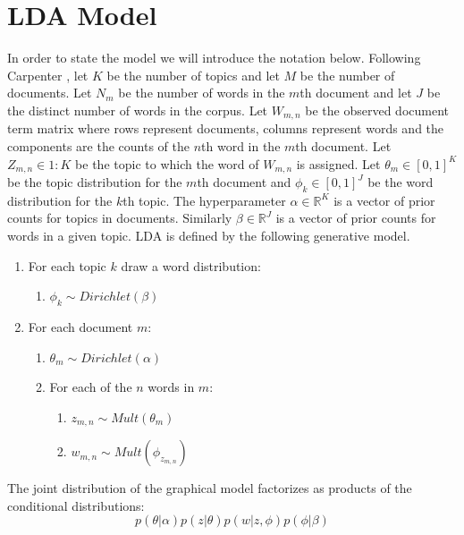 \documentclass{article}%
\theoremstyle{definition}
\begin{document}
\section{LDA Model}
\label{sec:ldamodel}
In order to state the model we will introduce the notation below. Following Carpenter \cite{Carpenter10integrating}, let $K$ be the number of topics and let $M$ be the number of documents. Let $N_m$ be the number of words in the $m$th document and let $J$ be the distinct number of words in the corpus. Let  $W_{m,n}$ be the observed document term matrix where rows represent documents, columns represent words and the components are the counts of the $n$th word in the $m$th document. Let $Z_{m,n} \in 1:K$ be the topic to which the word of $W_{m,n}$ is assigned. Let $\theta_m \in [0, 1]^K$ be the topic distribution for the $m$th document and $\phi_k \in [0, 1]^J$ be the word distribution for the $k$th topic. The hyperparameter $\alpha \in \mathbb{R}^K$ is a vector of prior counts for topics in documents. Similarly $\beta \in \mathbb{R}^J$ is a vector of prior counts for words in a given topic.
LDA is defined by the following generative model.
\begin{enumerate}
    \item For each topic $k$ draw a word distribution: 
    \begin{enumerate}
        \item $\phi_k \sim Dirichlet(\beta)$
    \end{enumerate}
    \item For each document $m$: 
        \begin{enumerate}
        \item $\theta_m \sim Dirichlet(\alpha)$
        \item For each of the $n$ words in $m$:
        \begin{enumerate}
            \item $z_{m,n} \sim Mult(\theta_m) $
            \item $w_{m,n} \sim Mult(\phi_{z_{m,n}}) $ 
        \end{enumerate}
        \end{enumerate}
\end{enumerate}
The joint distribution of the graphical model factorizes as products of the conditional distributions:
\begin{equation}
    p(\theta | \alpha)p(z|\theta) p(w|z, \phi)p(\phi | \beta)
\end{equation}
\end{document}
